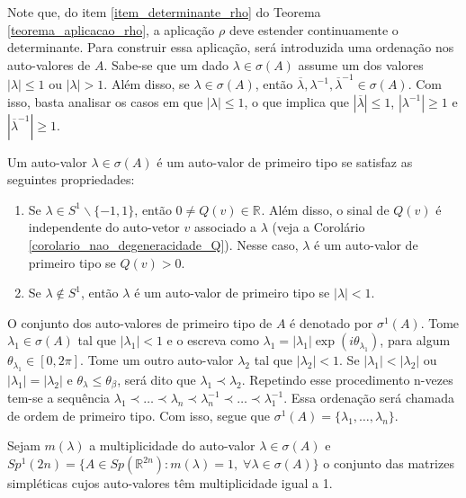 \documentclass[12pt]{book}
\newcommand{\autovalorprimeirotipo}[1]{\sigma^{1}(#1)}
\newcommand{\circulo}{S^{1}}
\newcommand{\espectrooperador}[1]{\sigma(#1)}
\newcommand{\gruposimpletico}[1]{Sp(#1)}
\newcommand{\gruposimpleticoespecial}[1]{Sp^{1}(#1)}
\newcommand{\real}[1]{\mathbb{R}^{#1}}
\newcommand{\reta}{\real{}}
\begin{document}
	Note que, do item \ref{item_determinante_rho} do Teorema \ref{teorema_aplicacao_rho}, a aplicação $\rho$ deve estender continuamente o determinante. Para construir essa aplicação, será introduzida uma ordenação nos auto-valores de $A$. Sabe-se que um dado $\lambda \in \espectrooperador{A}$ assume um dos valores $|\lambda|\leq 1$ ou $|\lambda|>1$. Além disso, se $\lambda \in \espectrooperador{A}$, então $\overline{\lambda}, \lambda^{-1}, \overline{\lambda}^{-1} \in \espectrooperador{A}$. Com isso, basta analisar os casos em que $|\lambda| \leq 1$, o que implica que $|\overline{\lambda}|\leq 1$, $|\lambda^{-1}|\geq 1$ e $|\overline{\lambda}^{-1}|\geq 1$.
	
	Um auto-valor $\lambda \in \espectrooperador{A}$ é um auto-valor de primeiro tipo se satisfaz as seguintes propriedades: 
	\begin{enumerate}
		\item Se $\lambda \in \circulo\backslash\{-1,1\}$, então $0\neq Q(v)\in \reta$. Além disso, o sinal de $Q(v)$ é independente do auto-vetor $v$ associado a $\lambda$ (veja a Corolário \ref{corolario_nao_degeneracidade_Q}). Nesse caso, $\lambda$ é um auto-valor de primeiro tipo se $Q(v)>0$.
		
		\item Se $\lambda\notin \circulo$, então $\lambda$ é um auto-valor de primeiro tipo se $|\lambda|<1$.
	\end{enumerate}
	
	O conjunto dos auto-valores de primeiro tipo de $A$ é denotado por $\autovalorprimeirotipo{A}$. Tome $\lambda_{1}\in \sigma(A)$ tal que $|\lambda_{1}|<1$ e o escreva como $\lambda_{1} = |\lambda_{1}|\exp(i\theta_{\lambda_{1}})$, para algum $\theta_{\lambda_{1}} \in [0,2\pi]$. Tome um outro auto-valor $\lambda_{2}$ tal que $|\lambda_{2}|<1$. Se $|\lambda_{1}| < |\lambda_{2}|$ ou  $|\lambda_{1}|= |\lambda_{2}|$ e $\theta_{\lambda} \leq \theta_{\beta}$, será dito que $\lambda_{1} \prec \lambda_{2}$. Repetindo esse procedimento n-vezes tem-se a sequência $\lambda_{1} \prec \dots \prec \lambda_{n} \prec  \lambda_{n}^{-1} \prec \dots \prec \lambda_{1}^{-1}$. Essa ordenação será chamada de ordem de primeiro tipo. Com isso, segue que $\autovalorprimeirotipo{A} = \{\lambda_{1} ,\dots, \lambda_{n} \}$.
	
	Sejam $m(\lambda)$ a multiplicidade do auto-valor $\lambda \in \espectrooperador{A}$  e $\gruposimpleticoespecial{2n} =\{A\in \gruposimpletico{\real{2n}} : m(\lambda) = 1,\;\forall \lambda\in \espectrooperador{A} \}$ o conjunto das matrizes simpléticas cujos auto-valores têm multiplicidade igual a 1.
	
\end{document}
